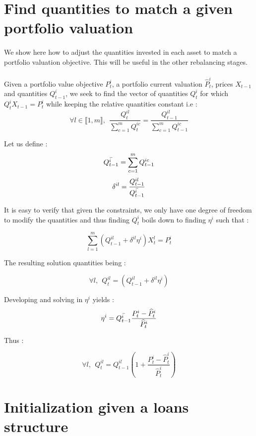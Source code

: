 \documentclass{article}
\begin{document}
\begin{appendices}

\section{Find quantities to match a given portfolio valuation}\label{matching_quantities}
\paragraph{}
We show here how to adjust the quantities invested in each asset to match a portfolio valuation objective. This will be useful in the other rebalancing stages.

\paragraph{}
Given a portfolio value objective $P_t^{i}$, a portfolio current valuation $\widehat {P}_t^{i}$, prices $X_{t-1}$ and quantities $Q_{t-1}^i$, we seek to find the vector of quantities $Q_t^{i}$ for which $Q_t^{i}X_{t-1} = P_t^{i}$ while keeping the relative quantities constant i.e : 
$$\forall l \in \llbracket 1, m \rrbracket,~~ \frac{Q_t^{il}}{\sum_{c=1}^m Q_t^{ic}} = \frac{Q_{t-1}^{il}}{\sum_{c=1}^m Q_{t-1}^{ic}}$$

Let us define : $$\Bar{Q_{t-1}^i} = \sum_{c=1}^m Q_{t-1}^{ic}$$
$$\delta^{il} = \frac{Q_{t-1}^{il}}{\Bar{Q_{t-1}^i}}$$


It is easy to verify that given the constraints, we only have one degree of freedom to modify the quantities and thus finding $Q_t^{i}$ boils down to finding $\eta^i$ such that : 

$$\sum_{l=1}^m (Q_{t-1}^{il} + \delta^{il}\eta^i)X_t^l = P_t^{i}$$

The resulting solution quantities being :

$$\forall l,~~ Q_t^{il} =  (Q_{t-1}^{il} + \delta^{il}\eta^i) $$

Developing and solving in $\eta^i$ yields : 
$$ \eta^i = \Bar{Q_{t-1}^i} \frac{P_t^{i} - \widehat{P}_t^i}{\widehat{P}_t^i}$$

Thus : 

\begin{equation*}
\forall l,~~ Q_t^{il} = Q_{t-1}^{il}\left(1 + \frac{P_t^{i} - \widehat{P}_t^i}{\widehat{P}_t^i} \right)
\end{equation*}


\section{Initialization given a loans structure}


\end{appendices}
\end{document}
